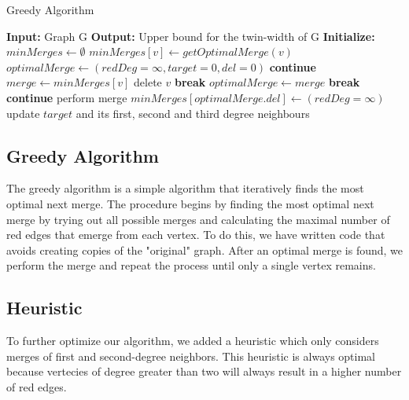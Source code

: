 \documentclass[10pt]{article}
\begin{document}
\begin{algorithm}[H]
    \caption{Greedy Algorithm}
    \label{alg:greedy}
    \begin{algorithmic}[1]
        \State \textbf{Input:} Graph G
        \State \textbf{Output:} Upper bound for the twin-width of G
        \State \textbf{Initialize:} $minMerges \gets \emptyset$
        \State $minMerges[v] \gets getOptimalMerge(v)$
        \EndFor
        \State $optimalMerge \gets (redDeg = \infty, target = 0, del = 0)$
        \State \textbf{continue}
        \EndIf
        \State $merge \gets minMerges[v]$
        \State delete $v$
        \State \textbf{break}
        \EndIf
        \State $optimalMerge \gets merge$
        \EndIf
        \State \textbf{break}
        \EndIf
        \EndFor
        \State \textbf{continue}
        \EndIf
        \State perform merge
        \State $minMerges[optimalMerge.del] \gets (redDeg = \infty)$
        \State update $target$ and its first, second and third degree neighbours
        \EndFor
    \end{algorithmic}
\end{algorithm}

\subsection{Greedy Algorithm}
The greedy algorithm is a simple algorithm that iteratively finds the most optimal next
merge. The procedure begins by finding the most optimal next merge by trying out all
possible merges and calculating the maximal number of red edges that emerge from each
vertex. To do this, we have written code that avoids creating copies of the "original"
graph. After an optimal merge is found, we perform the merge and repeat the process until
only a single vertex remains.

\subsection{Heuristic}
To further optimize our algorithm, we added a heuristic which only considers merges of
first and second-degree neighbors. This heuristic is always optimal because vertecies of
degree greater than two will always result in a higher number of red edges.
\end{document}
